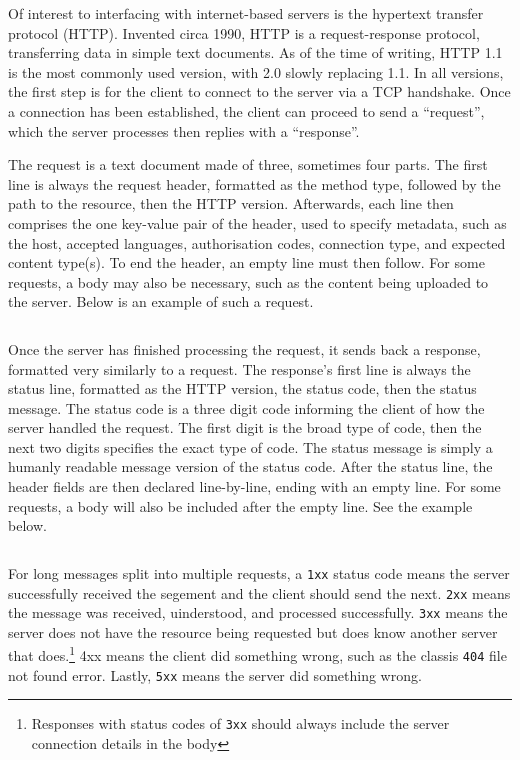 \documentclass[11pt]{article}
\begin{document}
Of interest to interfacing with internet-based servers is the hypertext transfer protocol (HTTP). Invented circa 1990, HTTP is a request-response protocol, transferring data in simple text documents. As of the time of writing, HTTP 1.1 is the most commonly used version, with 2.0 slowly replacing 1.1. In all versions, the first step is for the client to connect to the server via a TCP handshake. Once a connection has been established, the client can proceed to send a ``request'', which the server processes then replies with a ``response''.

The request is a text document made of three, sometimes four parts. The first line is always the request header, formatted as the method type, followed by the path to the resource, then the HTTP version. Afterwards, each line then comprises the one key-value pair of the header, used to specify metadata, such as the host, accepted languages, authorisation codes, connection type, and expected content type(s). To end the header, an empty line must then follow. For some requests, a body may also be necessary, such as the content being uploaded to the server. Below is an example of such a request.

\vspace{0.5\baselineskip}

\inputminted[linenos=true]{html}{http_examples/post_request.html}

Once the server has finished processing the request, it sends back a response, formatted very similarly to a request. The response's first line is always the status line, formatted as the HTTP version, the status code, then the status message. The status code is a three digit code informing the client of how the server handled the request. The first digit is the broad type of code, then the next two digits specifies the exact type of code. The status message is simply a humanly readable message version of the status code. After the status line, the header fields are then declared line-by-line, ending with an empty line. For some requests, a body will also be included after the empty line. See the example below.

\vspace{0.5\baselineskip}

\inputminted[linenos=true]{html}{http_examples/get_response.html}

\begin{info}
For long messages split into multiple requests, a \texttt{1xx} status code means the server successfully received the segement and the client should send the next. \texttt{2xx} means the message was received, uinderstood, and processed successfully. \texttt{3xx} means the server does not have the resource being requested but does know another server that does.\footnote{Responses with status codes of \texttt{3xx} should always include the server connection details in the body} 4xx means the client did something wrong, such as the classis \texttt{404} file not found error. Lastly, \texttt{5xx} means the server did something wrong.
\end{info}
\end{document}
